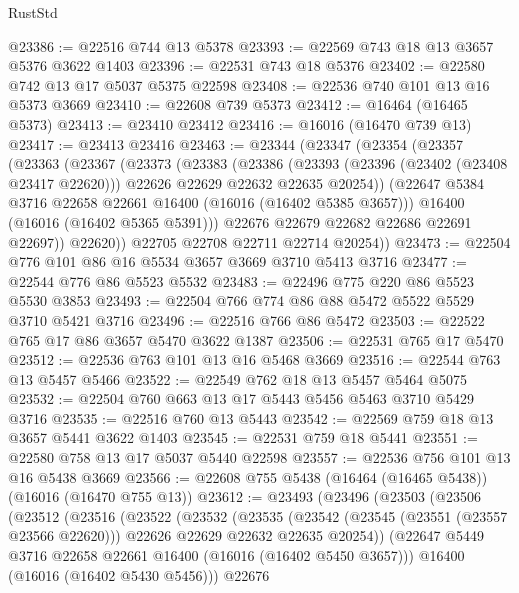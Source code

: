 \begin{lexlean}{RustStd}
\begin{coremodule}
@23386 := @22516 @744 @13 @5378
@23393 := @22569 @743 @18 @13 @3657 @5376 @3622 @1403
@23396 := @22531 @743 @18 @5376
@23402 := @22580 @742 @13 @17 @5037 @5375 @22598
@23408 := @22536 @740 @101 @13 @16 @5373 @3669
@23410 := @22608 @739 @5373
@23412 := @16464 (@16465 @5373)
@23413 := @23410 @23412
@23416 := @16016 (@16470 @739 @13)
@23417 := @23413 @23416
@23463 := @23344
    (@23347
      (@23354
        (@23357
          (@23363
            (@23367
              (@23373
                (@23383
                  (@23386
                    (@23393
                      (@23396 (@23402 (@23408 @23417 @22620)))
                      @22626
                      @22629
                      @22632
                      @22635
                      @20254))
                  (@22647 @5384 @3716 @22658 @22661 @16400 (@16016 (@16402 @5385 @3657)))
                  @16400
                  (@16016 (@16402 @5365 @5391)))
                @22676
                @22679
                @22682
                @22686
                @22691
                @22697))
            @22620))
        @22705
        @22708
        @22711
        @22714
        @20254))
@23473 := @22504 @776 @101 @86 @16 @5534 @3657 @3669 @3710 @5413 @3716
@23477 := @22544 @776 @86 @5523 @5532
@23483 := @22496 @775 @220 @86 @5523 @5530 @3853
@23493 := @22504 @766 @774 @86 @88 @5472 @5522 @5529 @3710 @5421 @3716
@23496 := @22516 @766 @86 @5472
@23503 := @22522 @765 @17 @86 @3657 @5470 @3622 @1387
@23506 := @22531 @765 @17 @5470
@23512 := @22536 @763 @101 @13 @16 @5468 @3669
@23516 := @22544 @763 @13 @5457 @5466
@23522 := @22549 @762 @18 @13 @5457 @5464 @5075
@23532 := @22504 @760 @663 @13 @17 @5443 @5456 @5463 @3710 @5429 @3716
@23535 := @22516 @760 @13 @5443
@23542 := @22569 @759 @18 @13 @3657 @5441 @3622 @1403
@23545 := @22531 @759 @18 @5441
@23551 := @22580 @758 @13 @17 @5037 @5440 @22598
@23557 := @22536 @756 @101 @13 @16 @5438 @3669
@23566 := @22608 @755 @5438 (@16464 (@16465 @5438)) (@16016 (@16470 @755 @13))
@23612 := @23493
    (@23496
      (@23503
        (@23506
          (@23512
            (@23516
              (@23522
                (@23532
                  (@23535
                    (@23542
                      (@23545 (@23551 (@23557 @23566 @22620)))
                      @22626
                      @22629
                      @22632
                      @22635
                      @20254))
                  (@22647 @5449 @3716 @22658 @22661 @16400 (@16016 (@16402 @5450 @3657)))
                  @16400
                  (@16016 (@16402 @5430 @5456)))
                @22676

\end{coremodule}
\end{lexlean}
